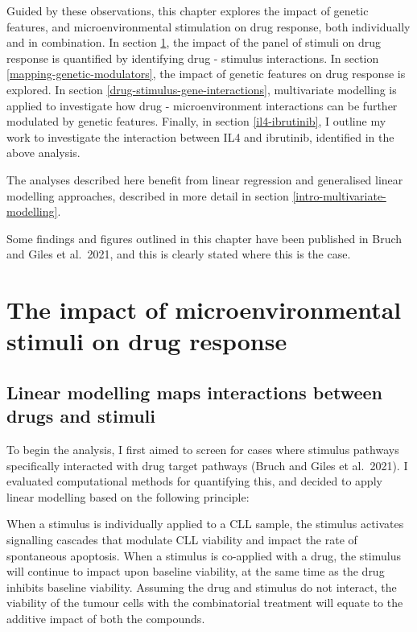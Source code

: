 \documentclass[11pt, a4paper, twosided]{book}
\begin{document}
Guided by these observations, this chapter explores the impact of genetic features, and microenvironmental stimulation on drug response, both individually and in combination. In section \ref{mapping-interactions}, the impact of the panel of stimuli on drug response is quantified by identifying drug - stimulus interactions. In section \ref{mapping-genetic-modulators}, the impact of genetic features on drug response is explored. In section \ref{drug-stimulus-gene-interactions}, multivariate modelling is applied to investigate how drug - microenvironment interactions can be further modulated by genetic features. Finally, in section \ref{il4-ibrutinib}, I outline my work to investigate the interaction between IL4 and ibrutinib, identified in the above analysis.

The analyses described here benefit from linear regression and generalised linear modelling approaches, described in more detail in section \ref{intro-multivariate-modelling}.

Some findings and figures outlined in this chapter have been published in Bruch and Giles et al.~2021, and this is clearly stated where this is the case.

\hypertarget{mapping-interactions}{%
\section{The impact of microenvironmental stimuli on drug response}\label{mapping-interactions}}

\hypertarget{drug-stimulus-linear-model}{%
\subsection{Linear modelling maps interactions between drugs and stimuli}\label{drug-stimulus-linear-model}}

To begin the analysis, I first aimed to screen for cases where stimulus pathways specifically interacted with drug target pathways (Bruch and Giles et al.~2021). I evaluated computational methods for quantifying this, and decided to apply linear modelling based on the following principle:

When a stimulus is individually applied to a CLL sample, the stimulus activates signalling cascades that modulate CLL viability and impact the rate of spontaneous apoptosis. When a stimulus is co-applied with a drug, the stimulus will continue to impact upon baseline viability, at the same time as the drug inhibits baseline viability. Assuming the drug and stimulus do not interact, the viability of the tumour cells with the combinatorial treatment will equate to the additive impact of both the compounds.
\end{document}
